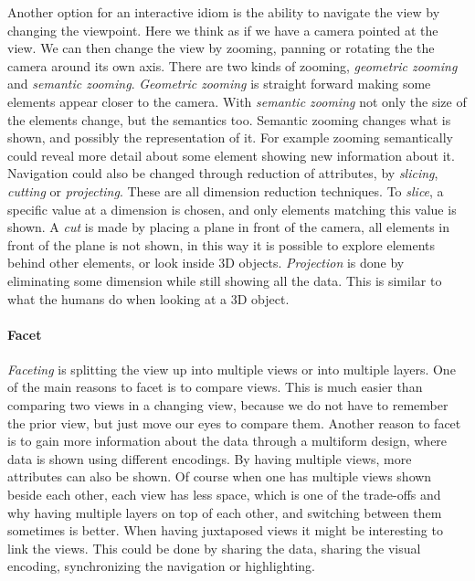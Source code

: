 \documentclass[Report.tex]{subfiles}
\begin{document}
Another option for an interactive idiom is the ability to navigate the view by changing the viewpoint. Here we think as if we have a camera pointed at the view. We can then change the view by zooming, panning or rotating the the camera around its own axis. There are two kinds of zooming, \emph{geometric zooming} and \emph{semantic zooming}. \emph{Geometric zooming} is straight forward making some elements appear closer to the camera. With \emph{semantic zooming} not only the size of the elements change, but the semantics too. Semantic zooming changes what is shown, and possibly the representation of it. For example zooming semantically could reveal more detail about some element showing new information about it.
Navigation could also be changed through reduction of attributes, by \emph{slicing}, \emph{cutting} or \emph{projecting}. These are all dimension reduction techniques. To \emph{slice}, a specific value at a dimension is chosen, and only elements matching this value is shown. A \emph{cut} is made by placing a plane in front of the camera, all elements in front of the plane is not shown, in this way it is possible to explore elements behind other elements, or look inside 3D objects. \emph{Projection} is done by eliminating some dimension while still showing all the data. This is similar to what the humans do when looking at a 3D object.
\paragraph{Facet\\}
\emph{Faceting} is splitting the view up into multiple views or into multiple layers. One of the main reasons to facet is to compare views. This is much easier than comparing two views in a changing view, because we do not have to remember the prior view, but just move our eyes to compare them. Another reason to facet is to gain more information about the data through a multiform design, where data is shown using different encodings. By having multiple views, more attributes can also be shown. Of course when one has multiple views shown beside each other, each view has less space, which is one of the trade-offs and why having multiple layers on top of each other, and switching between them sometimes is better. When having juxtaposed views it might be interesting to link the views.  This could be done by sharing the data, sharing the visual encoding, synchronizing the navigation or highlighting. 
\end{document}
